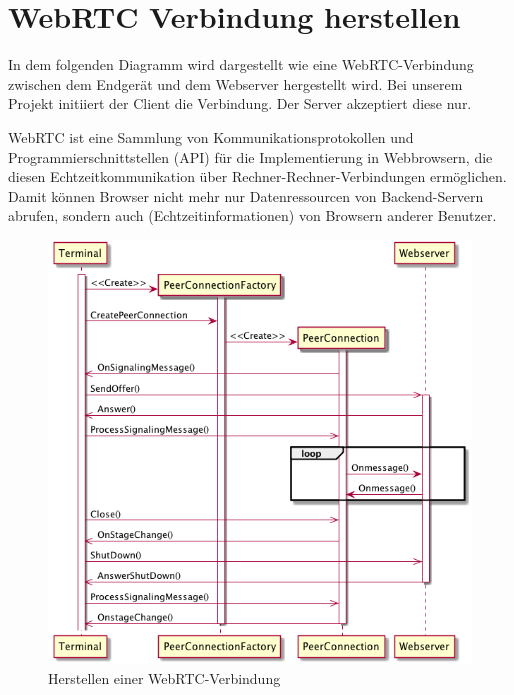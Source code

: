 \documentclass[entwurf.tex]{subfiles}
\begin{document}
  	\section{WebRTC Verbindung herstellen}
  	\label{Sequence:WebRTCConnect}
		In dem folgenden Diagramm wird dargestellt wie eine WebRTC-Verbindung zwischen dem Endgerät und dem Webserver hergestellt wird. Bei unserem Projekt initiiert der Client die Verbindung. Der Server akzeptiert diese nur.
		
		WebRTC ist eine Sammlung von Kommunikationsprotokollen und Programmierschnittstellen (API) für die Implementierung in Webbrowsern, die diesen Echtzeitkommunikation über Rechner-Rechner-Verbindungen ermöglichen. Damit können Browser nicht mehr nur Datenressourcen von Backend-Servern abrufen, sondern auch (Echtzeitinformationen) von Browsern anderer Benutzer.
		
		\begin{figure}[H]
			\begin{center}
	 			\includegraphics[width=\textwidth]{diagrams/DataTransferSequenz.png}
  				\caption{Herstellen einer WebRTC-Verbindung}
  			\end{center}
  		\end{figure}
  		
  	\newpage
\end{document}
